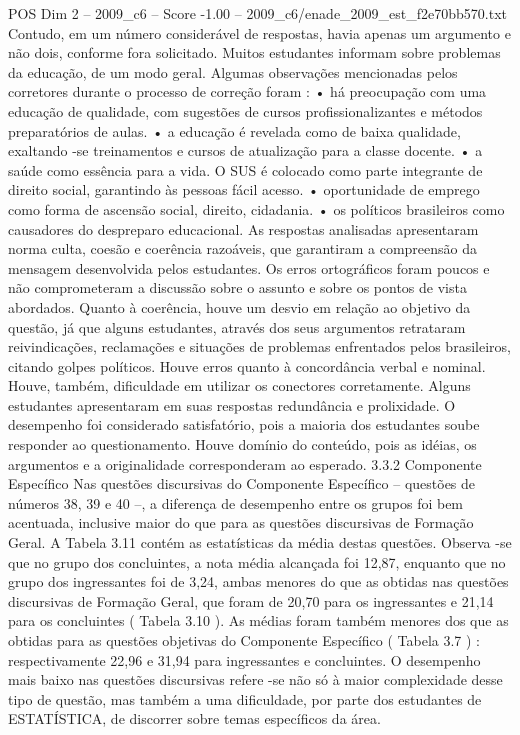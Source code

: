 \begin{textsample}{POS Dim 2 – 2009\_c6 – Score -1.00 – 2009\_c6/enade\_2009\_est\_f2e70bb570.txt}
Contudo, em um número considerável de respostas, havia apenas um argumento e não dois, conforme fora solicitado.
Muitos estudantes informam sobre problemas da educação, de um modo geral.
Algumas observações mencionadas pelos corretores durante o processo de correção foram : • há preocupação com uma educação de qualidade, com sugestões de cursos profissionalizantes e métodos preparatórios de aulas. • a educação é revelada como de baixa qualidade, exaltando -se treinamentos e cursos de atualização para a classe docente. • a saúde como essência para a vida.
O SUS é colocado como parte integrante de direito social, garantindo às pessoas fácil acesso. • oportunidade de emprego como forma de ascensão social, direito, cidadania. • os políticos brasileiros como causadores do despreparo educacional.
As respostas analisadas apresentaram norma culta, coesão e coerência razoáveis, que garantiram a compreensão da mensagem desenvolvida pelos estudantes.
Os erros ortográficos foram poucos e não comprometeram a discussão sobre o assunto e sobre os pontos de vista abordados.
Quanto à coerência, houve um desvio em relação ao objetivo da questão, já que alguns estudantes, através dos seus argumentos retrataram reivindicações, reclamações e situações de problemas enfrentados pelos brasileiros, citando golpes políticos.
Houve erros quanto à concordância verbal e nominal.
Houve, também, dificuldade em utilizar os conectores corretamente.
Alguns estudantes apresentaram em suas respostas redundância e prolixidade.
O desempenho foi considerado satisfatório, pois a maioria dos estudantes soube responder ao questionamento.
Houve domínio do conteúdo, pois as idéias, os argumentos e a originalidade corresponderam ao esperado. 3.3.2 Componente Específico Nas questões discursivas do Componente Específico – questões de números 38, 39 e 40 –, a diferença de desempenho entre os grupos foi bem acentuada, inclusive maior do que para as questões discursivas de Formação Geral.
A Tabela 3.11 contém as estatísticas da média destas questões.
Observa -se que no grupo dos concluintes, a nota média alcançada foi 12,87, enquanto que no grupo dos ingressantes foi de 3,24, ambas menores do que as obtidas nas questões discursivas de Formação Geral, que foram de 20,70 para os ingressantes e 21,14 para os concluintes ( Tabela 3.10 ).
As médias foram também menores dos que as obtidas para as questões objetivas do Componente Específico ( Tabela 3.7 ) : respectivamente 22,96 e 31,94 para ingressantes e concluintes.
O desempenho mais baixo nas questões discursivas refere -se não só à maior complexidade desse tipo de questão, mas também a uma dificuldade, por parte dos estudantes de ESTATÍSTICA, de discorrer sobre temas específicos da área.

\end{textsample}
